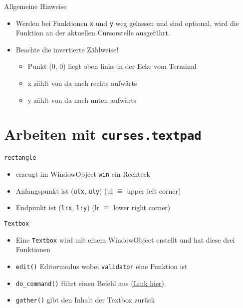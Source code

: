 \begin{frame}{Allgemeine Hinweise}
	\begin{itemize}
		\item Werden bei Funktionen \texttt{x} und \texttt{y} weg gelassen und sind optional, wird die Funktion an der aktuellen Cursorstelle ausgeführt.
		\item Beachte die invertierte Zählweise!
		\begin{itemize}
			\item Punkt (0, 0) liegt oben links in der Ecke vom Terminal
			\item x zählt von da nach rechts aufwärts
			\item y zählt von da nach unten aufwärts
		\end{itemize}
	\end{itemize}
\end{frame}

\section{Arbeiten mit \texttt{curses.textpad}}
\begin{frame}{\texttt{rectangle}}
	
	\begin{itemize}
		\item erzeugt im WindowObject \texttt{win} ein Rechteck
		\item Anfangspunkt ist (\texttt{ulx}, \texttt{uly}) (ul $\hat=$ upper left corner)
		\item Endpunkt ist (\texttt{lrx}, \texttt{lry}) (lr $\hat=$ lower right corner)
	\end{itemize}
\end{frame}

\begin{frame}{\texttt{Textbox}}
	
	\begin{itemize}
		\item Eine \texttt{Textbox} wird mit einem WindowObject erstellt und hat diese drei Funktionen
		\item \texttt{edit()} \glqq{}Editormodus\grqq{} wobei \texttt{validator} eine Funktion ist
		\item \texttt{do\_command()} f\"uhrt einen Befehl aus \href{http://bit.ly/29sJ8QJ}{(Link hier)}
		\item \texttt{gather()} gibt den Inhalt der Textbox zur\"uck
	\end{itemize}
\end{frame}



